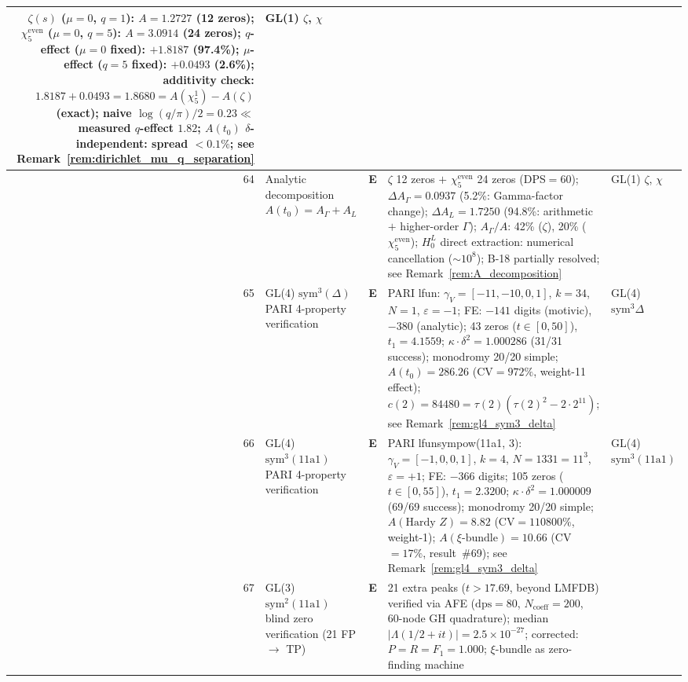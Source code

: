\documentclass[11pt, a4paper]{article}
\theoremstyle{definition}
\theoremstyle{plain}
\begin{document}
\begin{center}
\begin{longtable}{@{}r l l p{4.2cm} l@{}}
   $\zeta(s)$ ($\mu{=}0$, $q{=}1$): $A{=}1.2727$ (12 zeros);
   $\chi_5^{\mathrm{even}}$ ($\mu{=}0$, $q{=}5$): $A{=}3.0914$ (24 zeros);
   $q$-effect ($\mu{=}0$ fixed): $+1.8187$ (97.4\%);
   $\mu$-effect ($q{=}5$ fixed): $+0.0493$ (2.6\%);
   additivity check: $1.8187+0.0493{=}1.8680{=}A(\chi_5^1){-}A(\zeta)$ (exact);
   naive $\log(q/\pi)/2{=}0.23 \ll$ measured $q$-effect $1.82$;
   $A(t_0)$ $\delta$-independent: spread ${<}0.1\%$;
   see Remark~\ref{rem:dirichlet_mu_q_separation}
   & GL(1) $\zeta$, $\chi$ \\
\midrule
64 & Analytic decomposition $A(t_0) = A_\Gamma + A_L$ & \textbf{E} &
   $\zeta$ 12 zeros $+$ $\chi_5^{\mathrm{even}}$ 24 zeros (DPS${=}60$);
   $\Delta A_\Gamma{=}0.0937$ (5.2\%: Gamma-factor change);
   $\Delta A_L{=}1.7250$ (94.8\%: arithmetic $+$ higher-order $\Gamma$);
   $A_\Gamma/A$: 42\% ($\zeta$), 20\% ($\chi_5^{\mathrm{even}}$);
   $H_0^L$ direct extraction: numerical cancellation ($\sim10^8$);
   B-18 partially resolved;
   see Remark~\ref{rem:A_decomposition}
   & GL(1) $\zeta$, $\chi$ \\
\midrule
65 & GL(4) $\mathrm{sym}^3(\Delta)$ PARI 4-property verification & \textbf{E} &
   PARI lfun: $\gamma_V{=}[-11,-10,0,1]$, $k{=}34$, $N{=}1$, $\varepsilon{=}-1$;
   FE: $-141$ digits (motivic), $-380$ (analytic);
   43 zeros ($t{\in}[0,50]$), $t_1{=}4.1559$;
   $\kappa{\cdot}\delta^2{=}1.000286$ (31/31 success);
   monodromy 20/20 simple;
   $A(t_0){=}286.26$ (CV${=}972\%$, weight-11 effect);
   $c(2){=}84480{=}\tau(2)(\tau(2)^2{-}2\cdot 2^{11})$;
   see Remark~\ref{rem:gl4_sym3_delta}
   & GL(4) $\mathrm{sym}^3\Delta$ \\
\midrule
66 & GL(4) $\mathrm{sym}^3(11\mathrm{a}1)$ PARI 4-property verification & \textbf{E} &
   PARI lfunsympow(11a1, 3): $\gamma_V{=}[-1,0,0,1]$, $k{=}4$,
   $N{=}1331{=}11^3$, $\varepsilon{=}+1$;
   FE: $-366$ digits;
   105 zeros ($t{\in}[0,55]$), $t_1{=}2.3200$;
   $\kappa{\cdot}\delta^2{=}1.000009$ (69/69 success);
   monodromy 20/20 simple;
   $A(\text{Hardy }Z){=}8.82$ (CV${=}110800\%$, weight-1);
   $A(\xi\text{-bundle}){=}10.66$ (CV${=}17\%$, result~\#69);
   see Remark~\ref{rem:gl4_sym3_delta}
   & GL(4) $\mathrm{sym}^3(11\mathrm{a}1)$ \\
\midrule
67 & GL(3) $\mathrm{sym}^2(11\mathrm{a}1)$ blind zero verification (21 FP $\to$ TP) & \textbf{E} &
   21 extra peaks ($t{>}17.69$, beyond LMFDB) verified via AFE ($\mathrm{dps}{=}80$,
   $N_{\mathrm{coeff}}{=}200$, 60-node GH quadrature);
   median $|\Lambda(1/2{+}it)|{=}2.5{\times}10^{-27}$;
   corrected: $P{=}R{=}F_1{=}1.000$; $\xi$-bundle as zero-finding machine

\end{longtable}
\end{center}
\end{document}
